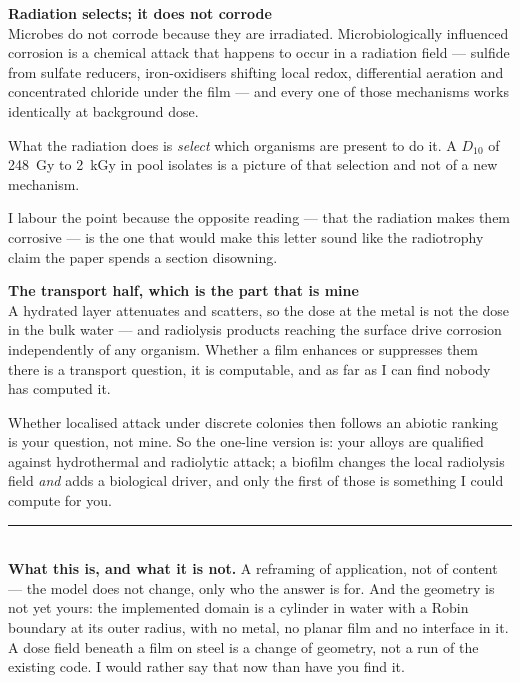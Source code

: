 \documentclass[landscape,12pt]{article}
\begin{document}
\vspace{2mm}
\begin{minipage}[t]{0.485\linewidth}
{\large\bfseries\color{prior} Radiation selects; it does not corrode}\\[3pt]
Microbes do not corrode because they are irradiated. Microbiologically influenced corrosion is a
chemical attack that happens to occur in a radiation field --- sulfide from sulfate reducers,
iron-oxidisers shifting local redox, differential aeration and concentrated chloride under the
film --- and every one of those mechanisms works identically at background dose.

\vspace{2mm}
What the radiation does is \emph{select} which organisms are present to do it. A $D_{10}$ of
248~Gy to 2~kGy in pool isolates is a picture of that selection and not of a new mechanism.

\vspace{2mm}
I labour the point because the opposite reading --- that the radiation makes them corrosive ---
is the one that would make this letter sound like the radiotrophy claim the paper spends a
section disowning.
\end{minipage}\hfill
\begin{minipage}[t]{0.485\linewidth}
{\large\bfseries\color{phys} The transport half, which is the part that is mine}\\[3pt]
A hydrated layer attenuates and scatters, so the dose at the metal is not the dose in the bulk
water --- and radiolysis products reaching the surface drive corrosion independently of any
organism. Whether a film enhances or suppresses them there is a transport question, it is
computable, and as far as I can find nobody has computed it.

\vspace{2mm}
Whether localised attack under discrete colonies then follows an abiotic ranking is your
question, not mine. So the one-line version is: your alloys are qualified against hydrothermal
and radiolytic attack; a biofilm changes the local radiolysis field \emph{and} adds a biological
driver, and only the first of those is something I could compute for you.

\vspace{4mm}
\noindent\rule{\linewidth}{0.4pt}\\[3pt]
{\small\textbf{What this is, and what it is not.} A reframing of application, not of content ---
the model does not change, only who the answer is for. And the geometry is not yet yours: the
implemented domain is a cylinder in water with a Robin boundary at its outer radius, with no
metal, no planar film and no interface in it. A dose field beneath a film on steel is a change
of geometry, not a run of the existing code. I would rather say that now than have you find it.}
\end{minipage}
\end{document}
